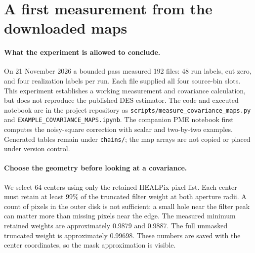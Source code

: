 \documentclass[11pt]{article}
\begin{document}
\section{A first measurement from the downloaded maps}
\paragraph{What the experiment is allowed to conclude.}
On 21 November 2026 a bounded pass measured 192 files: 48 run labels,
cut zero, and four realization labels per run. Each file supplied all four
source-bin slots. This experiment establishes a working measurement and
covariance calculation, but does not reproduce the published DES estimator.
The code and executed notebook are in the project repository as
\texttt{scripts/measure\_covariance\_maps.py} and
\texttt{EXAMPLE\_COVARIANCE\_MAPS.ipynb}. The companion PME notebook first
computes the noisy-square correction with scalar and two-by-two examples.
Generated tables remain under \texttt{chains/}; the map arrays are not copied
or placed under version control.

\paragraph{Choose the geometry before looking at a covariance.}
We select 64 centers using only the retained HEALPix pixel list. Each center
must retain at least 99\% of the truncated filter weight at both aperture
radii. A count of pixels in the outer disk is not sufficient: a small hole
near the filter peak can matter more than missing pixels near the edge.
The measured minimum retained weights are approximately 0.9879 and 0.9887.
The full unmasked truncated weight is approximately 0.99698. These numbers
are saved with the center coordinates, so the mask approximation is visible.
\end{document}
